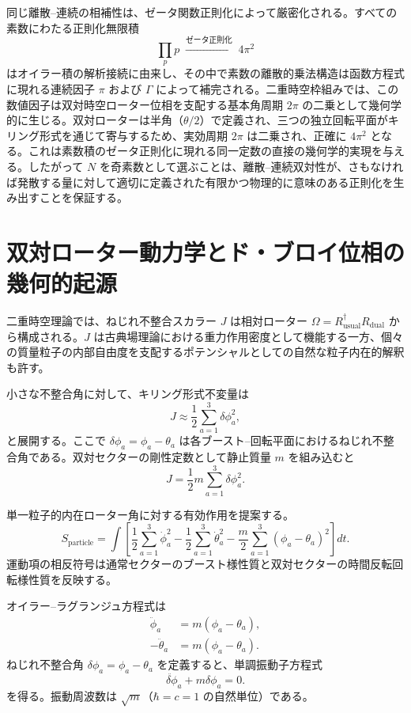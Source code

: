 \documentclass[dvipdfmx,a4paper]{article}
\begin{document}
同じ離散--連続の相補性は、ゼータ関数正則化によって厳密化される。すべての素数にわたる正則化無限積
\[
\prod_p p \;\overset{\text{ゼータ正則化}}{\longrightarrow}\; 4\pi^2
\]
はオイラー積の解析接続に由来し、その中で素数の離散的乗法構造は函数方程式に現れる連続因子 $\pi$ および $\Gamma$ によって補完される。二重時空枠組みでは、この数値因子は双対時空ローター位相を支配する基本角周期 $2\pi$ の二乗として幾何学的に生じる。双対ローターは半角（$\theta/2$）で定義され、三つの独立回転平面がキリング形式を通じて寄与するため、実効周期 $2\pi$ は二乗され、正確に $4\pi^2$ となる。これは素数積のゼータ正則化に現れる同一定数の直接の幾何学的実現を与える。したがって $N$ を奇素数として選ぶことは、離散--連続双対性が、さもなければ発散する量に対して適切に定義された有限かつ物理的に意味のある正則化を生み出すことを保証する。

\section{双対ローター動力学とド・ブロイ位相の幾何的起源}
\label{sec:dualrotordynamics}

二重時空理論では、ねじれ不整合スカラー $J$ は相対ローター $\Omega = R_{\text{usual}}^\dagger R_{\text{dual}}$ から構成される。$J$ は古典場理論における重力作用密度として機能する一方、個々の質量粒子の内部自由度を支配するポテンシャルとしての自然な粒子内在的解釈も許す。

小さな不整合角に対して、キリング形式不変量は
\[
J \approx \frac{1}{2} \sum_{a=1}^3 \delta\phi_a^2,
\]
と展開する。ここで $\delta\phi_a = \phi_a - \theta_a$ は各ブースト--回転平面におけるねじれ不整合角である。双対セクターの剛性定数として静止質量 $m$ を組み込むと
\[
J = \frac{1}{2} m \sum_{a=1}^3 \delta\phi_a^2.
\]

単一粒子的内在ローター角に対する有効作用を提案する。
\[
S_{\text{particle}} = \int \left[ \frac{1}{2} \sum_{a=1}^3 \dot{\phi}_a^2 - \frac{1}{2} \sum_{a=1}^3 \dot{\theta}_a^2 - \frac{m}{2} \sum_{a=1}^3 (\phi_a - \theta_a)^2 \right] dt.
\]
運動項の相反符号は通常セクターのブースト様性質と双対セクターの時間反転回転様性質を反映する。

オイラー--ラグランジュ方程式は
\begin{align}
\ddot{\phi}_a &= m (\phi_a - \theta_a), \\
-\ddot{\theta}_a &= m (\phi_a - \theta_a).
\end{align}
ねじれ不整合角 $\delta\phi_a = \phi_a - \theta_a$ を定義すると、単調振動子方程式
\begin{equation}
\ddot{\delta\phi}_a + m \delta\phi_a = 0.
\label{eq:dual-harmonic}
\end{equation}
を得る。振動周波数は $\sqrt{m}$（$\hbar = c = 1$ の自然単位）である。
\end{document}

